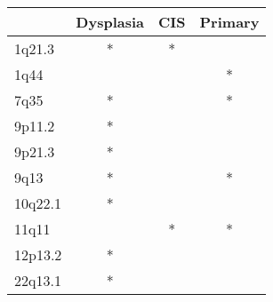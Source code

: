 \begin{tabular}{lccc}
\toprule
{} & Dysplasia & CIS & Primary \\
\midrule
1q21.3  &         * &   * &         \\
1q44    &           &     &       * \\
7q35    &         * &     &       * \\
9p11.2  &         * &     &         \\
9p21.3  &         * &     &         \\
9q13    &         * &     &       * \\
10q22.1 &         * &     &         \\
11q11   &           &   * &       * \\
12p13.2 &         * &     &         \\
22q13.1 &         * &     &         \\
\bottomrule
\end{tabular}
